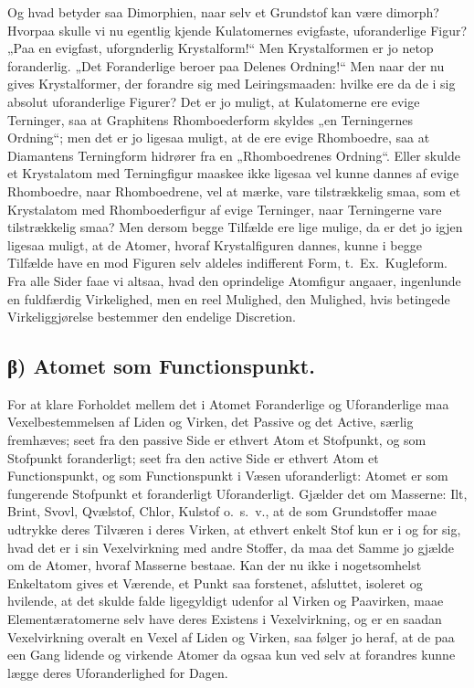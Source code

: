 \documentclass[12pt,a4paper]{book}
\begin{document}
Og hvad betyder saa Dimorphien, naar selv et Grundstof
kan være dimorph? Hvorpaa skulle vi nu egentlig kjende
Kulatomernes evigfaste, uforanderlige Figur? „Paa en
evigfast, uforgnderlig Krystalform!“
Men Krystalformen er jo
netop foranderlig. „Det Foranderlige beroer paa Delenes
Ordning!“ Men naar der nu gives Krystalformer, der forandre
sig med Leiringsmaaden: hvilke ere da de i sig absolut
uforanderlige Figurer? Det er jo muligt, at Kulatomerne
ere evige Terninger, saa at Graphitens Rhomboederform skyldes
„en Terningernes Ordning“; men det er jo ligesaa muligt,
at de ere evige Rhomboedre, saa at Diamantens Terningform
hidrører fra en „Rhomboedrenes Ordning“. Eller
skulde et Krystalatom med Terningfigur maaskee ikke ligesaa
vel kunne dannes af evige Rhomboedre, naar Rhomboedrene,
vel at mærke, vare tilstrækkelig smaa, som et Krystalatom
med Rhomboederfigur af evige Terninger, naar Terningerne
vare tilstrækkelig smaa? Men dersom begge Tilfælde ere lige
mulige, da er det jo igjen ligesaa muligt, at de Atomer,
hvoraf Krystalfiguren dannes, kunne i begge Tilfælde have
en mod Figuren selv aldeles indifferent Form, t.~Ex.\
Kugleform. Fra alle Sider faae vi altsaa, hvad den oprindelige
Atomfigur angaaer, ingenlunde en fuldfærdig Virkelighed,
men en reel Mulighed, den Mulighed, hvis betingede
Virkeliggjørelse bestemmer den endelige Discretion.

\subsection*{β) Atomet som Functionspunkt.}

For at klare Forholdet mellem det i Atomet Foranderlige
og Uforanderlige maa Vexelbestemmelsen af Liden og
Virken, det Passive og det Active, særlig fremhæves; seet
fra den passive Side er ethvert Atom et Stofpunkt, og som
Stofpunkt foranderligt; seet fra den active Side er ethvert
Atom et Functionspunkt, og som Functionspunkt i Væsen
uforanderligt: Atomet er som fungerende Stofpunkt et
foranderligt Uforanderligt. Gjælder det om Masserne: Ilt,
Brint, Svovl, Qvælstof, Chlor, Kulstof o.~s.~v., at de som
Grundstoffer maae udtrykke deres Tilværen i deres Virken,
at ethvert enkelt Stof kun er i og for sig, hvad det er i sin
Vexelvirkning med andre Stoffer, da maa det Samme jo
gjælde om de Atomer, hvoraf Masserne bestaae. Kan der
nu ikke i nogetsomhelst Enkeltatom gives et Værende, et Punkt
saa forstenet, afsluttet, isoleret og hvilende, at det skulde
falde ligegyldigt udenfor al Virken og Paavirken, maae
Elementæratomerne selv have deres Existens i Vexelvirkning, og
er en saadan Vexelvirkning overalt en Vexel af Liden og
Virken, saa følger jo heraf, at de paa een Gang lidende og
virkende Atomer da ogsaa kun ved selv at forandres kunne
lægge deres Uforanderlighed for Dagen.
\end{document}
